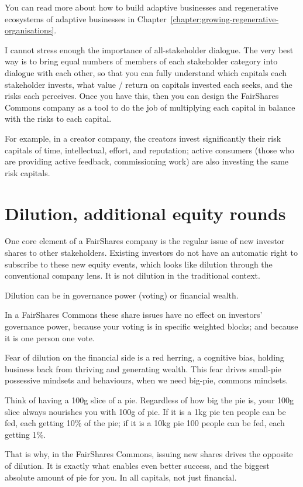 You can read more about how to build adaptive businesses and regenerative ecosystems of adaptive businesses in Chapter~\ref{chapter:growing-regenerative-organisations}.


I cannot stress enough the importance of all\hyp{}stakeholder dialogue. The very best way is to bring equal numbers of members of each stakeholder category into dialogue with each other, so that you can fully understand which capitals each stakeholder invests, what value / return on capitals invested each seeks, and the risks each perceives. Once you have this, then you can design the FairShares Commons company as a tool to do the job of multiplying each capital in balance with the risks to each capital. 


For example, in a creator company, the creators invest significantly their risk capitals of  time, intellectual, effort, and reputation; active consumers (those who are providing active feedback,  commissioning work) are also investing the same risk capitals.
\section{Dilution, additional equity rounds}
One core element of a FairShares company is the regular issue of new investor shares to other stakeholders. Existing investors do not have an automatic right to subscribe to these new equity events, which looks like dilution through the conventional company lens. It is not dilution in the traditional context.


Dilution can be in governance power (voting) or financial wealth. 


In a FairShares Commons these share issues have no effect on investors’ governance power, because your voting is in specific weighted blocks; and because it is one person one vote. 


Fear of dilution on the financial side is a red herring, a cognitive bias, holding business back from thriving and generating wealth. This fear drives small-pie possessive mindsets and behaviours, when we need big-pie, commons mindsets. 


Think of having a 100g slice of a pie. Regardless of how big the pie is, your 100g slice always nourishes you with 100g of pie. If it is a 1kg pie ten people can be fed, each getting 10\% of the pie; if it is a 10kg pie 100 people can be fed, each getting 1\%. 


That is why, in the FairShares Commons, issuing new shares drives the opposite of dilution. It is exactly what enables even better success, and the biggest absolute amount of pie for you. In all capitals, not just financial. 


